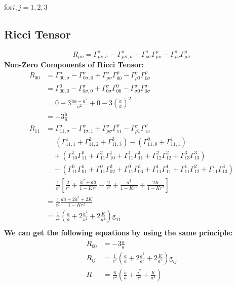 \documentclass[14pt]{article}
\newcommand{\csg}[2]{\Gamma^{#1}_{#2}}
\newcommand{\csgd}[3]{\Gamma^{#1}_{#2,#3}}
\newcommand{\g}{\mathrm{g}}
\newcommand{\Ricci}[2]{\csgd{\sigma}{#1#2}{\sigma} - \csgd{\sigma}{#1\sigma}{#2} +\csg{\sigma}{\rho \sigma}\csg{\rho}{#1 #2} -\csg{\sigma}{\rho #2}\csg{\rho}{#1\sigma}}
\begin{document}
for\(i,j=1,2,3\)
\subsection{Ricci Tensor}

\[
R_{\mu\nu}  = \Ricci{\mu}{\nu} \tag{1.3.1}
\]
\textbf{Non-Zero Components of Ricci Tensor:}
\begin{align*}
R_{00}  &= \Ricci{0}{0}\\
        &= \csg{0}{00,0} -\csg{\sigma}{0\sigma,0}  +\csg{\sigma}{0\sigma} \csg{0}{00} - \csg{\sigma}{\sigma 0} \csg{\sigma}{0\sigma}\\ 
        &= 0-3\frac{\ddot{a}a-\dot{a}^{2}}{a^{2}}+0-3(\frac{\dot{a}}{a})^{2}\\
        &= -3\frac{\ddot{a}}{a}\tag{1.3.2}\\
R_{11}  &= \Ricci{1}{1}\\
        &= (\csg{1}{11,1}+\csg{2}{11,2}+\csg{3}{11,3})-(\csg{0}{11,0}+\csg{1}{11,1})\\
        &\quad +(\csg{1}{10}\csg{0}{11}+\csg{2}{11}\csg{1}{10}+\csg{1}{11}\csg{1}{11}+\csg{2}{12}\csg{2}{12}+\csg{3}{13}\csg{3}{13})\\
        &\quad -(\csg{0}{11}\csg{1}{01}+\csg{0}{11}\csg{2}{02}+\csg{0}{11}\csg{3}{03}+\csg{1}{11}\csg{1}{11}+\csg{1}{11}\csg{2}{12}+\csg{1}{11}\csg{3}{13})\\
        &=\frac{1}{c^{2}}[\frac{2}{r^{2}}+\frac{\dot{a}^{2}+a\ddot{a}}{1-Kr^{2}}-\frac{2}{r^{2}}+\frac{\dot{a}^{2}}{1-Kr^{2}}+\frac{2K}{1-Kr^{2}}]\\
        &=\frac{1}{c^{2}}\frac{a\ddot{a}+2\dot{a}^{2}+2K}{1-Kr^{2}}\\
        &=\frac{1}{c^{2}}(\frac{\ddot{a}}{a}+2\frac{\dot{a}^{2}}{a^{2}}+2\frac{K}{a^{2}})\g_{11}\tag{1.3.3}\\
\end{align*}
\textbf{We can get the following equations by using the same principle:}
\begin{align*}
R_{00}  &= -3\frac{\ddot{a}}{a}\tag{1.3.4}\\
R_{ij}  &=\frac{1}{c^{2}}(\frac{\ddot{a}}{a}+2\frac{\dot{a}^{2}}{a^{2}}+2\frac{K}{a^{2}})\g_{ij}\tag{1.3.5}\\
R &= \frac{6}{c^{2}}(\frac{\ddot{a}}{a}+\frac{\dot{a}^{2}}{a^{2}}+\frac{K}{a^{2}})\tag{1.3.6}
\end{align*}
\end{document}
